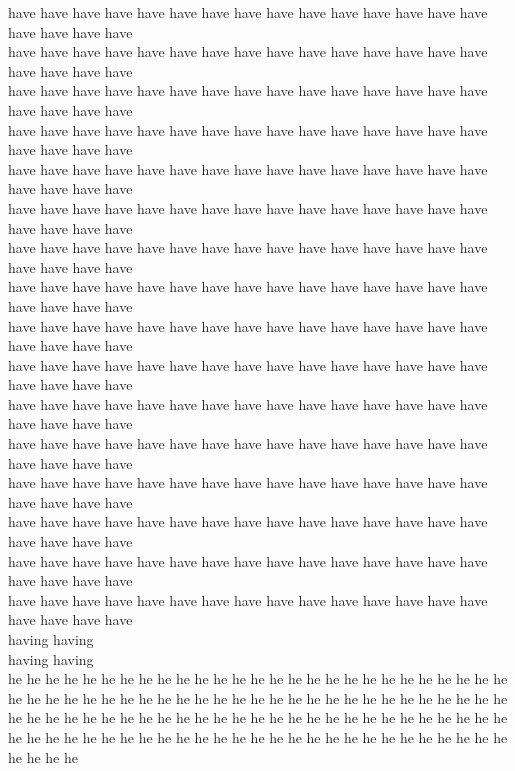 have have have have have have have have have have have have have have have have have have have\\
have have have have have have have have have have have have have have have have have have have\\
have have have have have have have have have have have have have have have have have have have\\
have have have have have have have have have have have have have have have have have have have\\
have have have have have have have have have have have have have have have have have have have\\
have have have have have have have have have have have have have have have have have have have\\
have have have have have have have have have have have have have have have have have have have\\
have have have have have have have have have have have have have have have have have have have\\
have have have have have have have have have have have have have have have have have have have\\
have have have have have have have have have have have have have have have have have have have\\
have have have have have have have have have have have have have have have have have have have\\
have have have have have have have have have have have have have have have have have have have\\
have have have have have have have have have have have have have have have have have have have\\
have have have have have have have have have have have have have have have have have have have\\
have have have have have have have have have have have have have have have have have have have\\
have have have have have have have have have have have have have have have have have have have\\
having having\\
having having\\
he he he he he he he he he he he he he he he he he he he he he he he he he he he he he he he he he he he he he he he he he he he he he he he he he he he he he he he he he he he he he he he he he he he he he he he he he he he he he he he he he he he he he he he he he he he he he he he he he he he he he he he he he he he he he he he he\\
